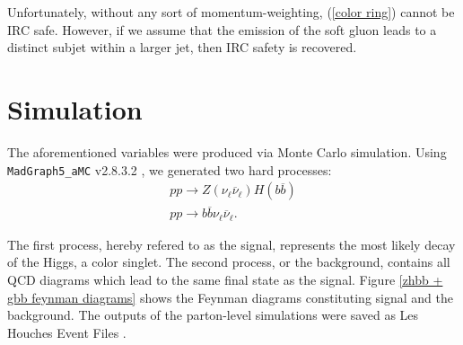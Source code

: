 \documentclass[10pt,a4paper]{book}
\def\code#1{\texttt{#1}}
\begin{document}
Unfortunately, without any sort of momentum-weighting, (\ref{color ring}) cannot be IRC safe. However, if we assume that the emission of the soft gluon leads to a distinct subjet within a larger jet, then IRC safety is recovered.

\section{Simulation}
\label{Simulation}

The aforementioned variables were produced via Monte Carlo simulation. Using \code{MadGraph5\_aMC} v2.8.3.2 \cite{Alwall:2014hca}, we generated two hard processes:
\begin{gather}
p p \rightarrow Z(\nu_\ell \overline{\nu}_\ell) H(b\overline{b}) \\
p p \rightarrow b\overline{b} \nu_\ell \overline{\nu}_\ell.
\end{gather}

The first process, hereby refered to as the signal, represents the most likely decay of the Higgs, a color singlet. The second process, or the background, contains all QCD diagrams which lead to the same final state as the signal. Figure \ref{zhbb + gbb feynman diagrams} shows the Feynman diagrams constituting signal and the background. The outputs of the parton-level simulations were saved as Les Houches Event Files \cite{Alwall:2006yp}.
\end{document}
